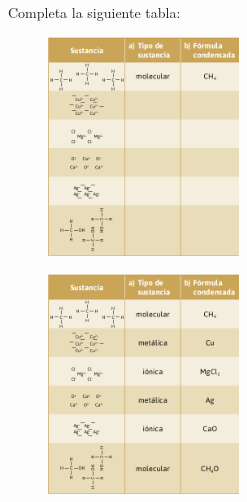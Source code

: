 \question[10] Completa la siguiente tabla:

\ifprintanswers
    \centering
    \begin{figure}
        \includegraphics[width=0.45\textwidth]{../images/sustancia_sol}
    \end{figure}
\else
    \centering
    \begin{figure}
        \includegraphics[width=0.45\textwidth]{../images/sustancia}
    \end{figure}
\fi
